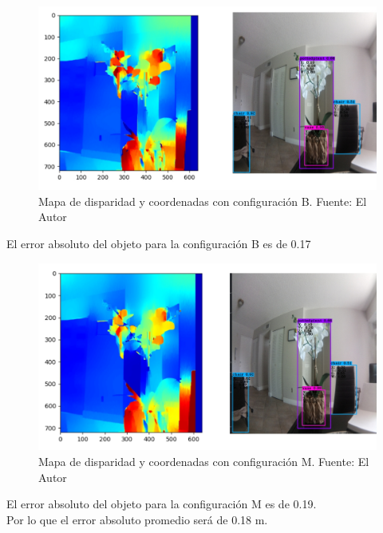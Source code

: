 \begin{figure}[H]
    \centering
    \includegraphics[scale=0.5]{Recursos/position_configuration_B.jpg}
    \caption[Mapa de disparidad y coordenadas con configuración B.]{Mapa de disparidad y coordenadas con configuración B. {\footnotesize Fuente: El Autor}}
    \label{pos_conf_B}
\end{figure}
El error absoluto del objeto para la configuración B es de 0.17
\begin{figure}[H]
    \centering
    \includegraphics[scale=0.5]{Recursos/position_configuration_M.jpg}
    \caption[Mapa de disparidad y coordenadas con configuración M.]{Mapa de disparidad y coordenadas con configuración M. {\footnotesize Fuente: El Autor}}
    \label{pos_conf_M}
\end{figure}
El error absoluto del objeto para la configuración M es de 0.19.
\\
Por lo que el error absoluto promedio será de 0.18 m.
